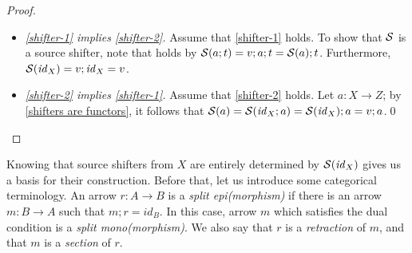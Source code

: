 %
\begin{fullorname}
\begin{proof}
\begin{itemize}[topsep=\smallskipamount]
\item \emph{\ref{shifter-1} implies \ref{shifter-2}.}
%
Assume that \ref{shifter-1} holds. To show that  $\mathcal{S}$ is a source shifter, note that   holds by $\mathcal{S}(a;t)=v;a;t=\mathcal{S}(a);t$. Furthermore, $\mathcal{S}(\mathit{id}_X)=v;\mathit{id}_X=v$.

\item \emph{\ref{shifter-2} implies \ref{shifter-1}.}
%
Assume that \ref{shifter-2} holds. Let $a:X\to Z$; by \eqref{shifters are functors}, it follows that $\mathcal{S}(a)=\mathcal{S}(\mathit{id}_X;a)=\mathcal{S}(\mathit{id}_X);a=v;a$.\qed
\end{itemize}
\end{proof}
\end{fullorname}
%
Knowing that source shifters from $X$ are entirely determined by $\mathcal{S}(\mathit{id}_X)$ gives us a basis for their construction. Before that, let us introduce some categorical terminology. An arrow $r: A \to B$ is a \emph{split epi(morphism)} if there is an arrow $m:B\to A$ such that $m;r = id_B$. In this case, arrow $m$ which satisfies the dual condition is a 
\emph{split mono(morphism)}. We also say that $r$ is a \emph{retraction} of $m$, and that $m$ is a \emph{section} of $r$.

